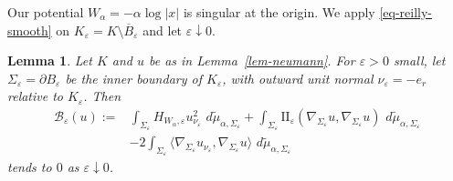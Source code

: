 \documentclass[12pt,leqno]{amsart}
\theoremstyle{plain} \newtheorem{thm}{Theorem}[section]
\theoremstyle{plain} \newtheorem{prop}[thm]{Proposition}
\theoremstyle{plain} \newtheorem{prob}[thm]{Problem}
\theoremstyle{definition} \newtheorem{defi}[thm]{Definition}
\theoremstyle{plain} \newtheorem{cor}[thm]{Corollary}
\theoremstyle{plain} \newtheorem{lem}[thm]{Lemma}
\theoremstyle{plain} \newtheorem{eg}{Example}[section]
\theoremstyle{remark} \newtheorem{rmk}[thm]{Remark}
\theoremstyle{plain} \newtheorem{conj}{Conjecture}
\numberwithin{equation}{section}
\newcommand{\dd}{\,d}
\begin{document}
Our potential $W_\alpha=-\alpha\log|x|$ is singular at the origin. We
apply \eqref{eq-reilly-smooth} on
$K_\varepsilon=K\setminus\overline B_\varepsilon$ and let
$\varepsilon\downarrow0$.

\begin{lem}
  \label{lem-inner-boundary}
  Let $K$ and $u$ be as in Lemma~\ref{lem-neumann}. For
  $\varepsilon>0$ small, let $\Sigma_\varepsilon=\partial B_\varepsilon$
  be the inner boundary of $K_\varepsilon$, with outward unit normal
  $\nu_\varepsilon=-e_r$ relative to $K_\varepsilon$. Then
  \begin{equation}\label{eq-inner-vanishing}
    \begin{aligned}
      \mathcal B_\varepsilon(u)
      :=&\int_{\Sigma_\varepsilon}
         H_{W_\alpha,\varepsilon}u_{\nu_\varepsilon}^2
         \,\dd\tilde{\mu}_{\alpha,\Sigma_\varepsilon}
        +\int_{\Sigma_\varepsilon}
         \mathrm{II}_\varepsilon(\nabla_{\Sigma_\varepsilon}u,
         \nabla_{\Sigma_\varepsilon}u)
         \,\dd\tilde{\mu}_{\alpha,\Sigma_\varepsilon}\\
        &-2\int_{\Sigma_\varepsilon}
         \langle\nabla_{\Sigma_\varepsilon}u_{\nu_\varepsilon},
         \nabla_{\Sigma_\varepsilon}u\rangle
         \,\dd\tilde{\mu}_{\alpha,\Sigma_\varepsilon}
    \end{aligned}
  \end{equation}
  tends to $0$ as $\varepsilon\downarrow0$.
\end{lem}
\end{document}
